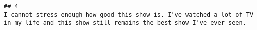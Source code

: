\documentclass[
]{article}
\begin{document}
\begin{verbatim}
## 4                                                                                                                                                                                                                                                                                                                                                                                                                                                                                                                                                                                                                                                                                                                                                                                                                                                                                                                                                                                                                                                                                                                                                                                                                                                                                                                                                                                                                                                                                                                                                                                                                                                                                                                                                                                                                                                                                                                                                                                                                                                                       I cannot stress enough how good this show is. I've watched a lot of TV in my life and this show still remains the best show I've ever seen.

\end{verbatim}
\end{document}
